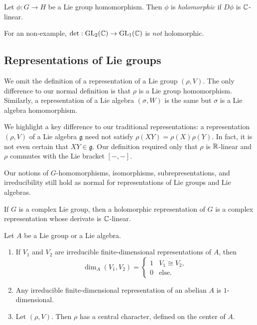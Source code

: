 \begin{definition}
    Let $\phi: G \to H$ be a Lie group homomorphism. Then $\phi$ is \emph{holomorphic} if $D\phi$ is $\mathbb C$-linear.
\end{definition}

\begin{example}
    For an non-example, $\det: \operatorname{GL}_2(\mathbb C) \to \operatorname{GL}_1(\mathbb C)$ is \emph{not} holomorphic. 
\end{example}

\subsection{Representations of Lie groups}

We omit the definition of a representation of a Lie group $(\rho, V)$. The only difference to our normal definition is that $\rho$ is a Lie group homomorphism. Similarly, a representation of a Lie algebra $(\sigma, W)$ is the same but $\sigma$ is a Lie algebra homomorphism. 

We highlight a key difference to our traditional representations: a representation $(\rho, V)$ of a Lie algebra $\mathfrak g$ need not satisfy $\rho(XY) = \rho(X)\rho(Y)$. In fact, it is not even certain that $XY \in \mathfrak g$. Our definition required only that $\rho$ is $\mathbb R$-linear and $\rho$ commutes with the Lie bracket $[-,-]$. 

Our notions of $G$-homomorphisms, isomorphisms, subrepresentations, and irreducibility still hold as normal for representations of Lie groups and Lie algebras. 

If $G$ is a complex Lie group, then a holomorphic representation of $G$ is a complex representation whose derivate is $\mathbb C$-linear.

\begin{theorem}
    Let $A$ be a Lie group or a Lie algebra.
    \begin{enumerate}
        \item If $V_1$ and $V_2$ are irreducible finite-dimensional representations of $A$, then
        \[
            \dim_A(V_1, V_2) =
            \begin{cases}
                1 & V_1 \cong V_2, \\
                0 & \text{else}.
            \end{cases}
        \]
        \item Any irreducible finite-dimensional representation of an abelian $A$ is $1$-dimensional.
        \item Let $(\rho, V)$. Then $\rho$ has a central character, defined on the center of $A$.
    \end{enumerate}
\end{theorem}

